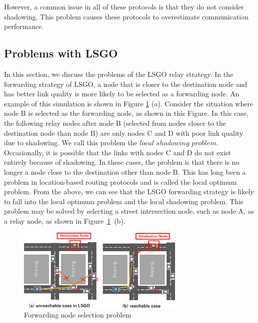 \documentclass[conference]{IEEEtran}
\begin{document}
However, a  common issue in all of these protocols is that they do not consider shadowing.
This problem causes these protocols to overestimate communication performance. 

\subsection{Problems with LSGO}

In this section, we discuss the problems of the LSGO relay strategy.  
In the forwarding strategy of LSGO, a node that is closer to the destination node and has better link quality is more likely to be selected as a forwarding node. 
An example of this simulation is shown in Figure \ref{fig:LSGO-route} (a). 
Consider the situation where node B is selected as the forwarding node, as shown in this Figure. 
In this case, the following relay nodes after node B (selected from nodes closer to the destination node than node B) are only nodes C and D with poor link quality due to shadowing.  
We call this problem the $local$ $shadowing$ $problem$. 
Occasionally, it is possible  that the links with nodes C and D do not exist entirely  because of  shadowing. 
In these cases, the problem is that there is no longer a node close to the destination other than  node B. 
This has long been a problem in  location-based routing protocols and is called the local optimum problem. 
From the above, we can see that the LSGO forwarding strategy is likely to fall into the local optimum problem and the local shadowing problem. This problem may be solved by selecting a street intersection node, such as node A, as a relay node, as shown in \mbox{Figure \ref{fig:LSGO-route} (b)}. 




\begin{figure}[!ht]
\centering
\includegraphics[width=80mm]{figures/efficient_route.eps}
\caption{Forwarding node selection problem}
\label{fig:LSGO-route}
\end{figure}
\end{document}
